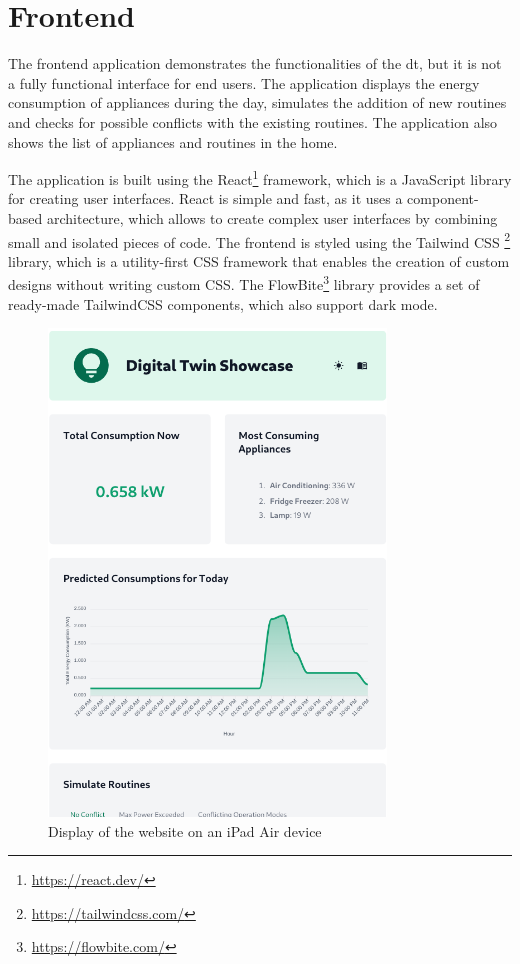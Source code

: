 \section{Frontend}

The frontend application demonstrates the functionalities of the \acrshort{dt}, but it is not a fully functional interface for end users. The application displays the energy consumption of appliances during the day, simulates the addition of new routines and checks for possible conflicts with the existing routines. The application also shows the list of appliances and routines in the home.

The application is built using the React\footnote{\url{https://react.dev/}} framework, which is a JavaScript library for creating user interfaces. React is simple and fast, as it uses a component-based architecture, which allows to create complex user interfaces by combining small and isolated pieces of code. The frontend is styled using the Tailwind CSS \footnote{\url{https://tailwindcss.com/}} library, which is a utility-first CSS framework that enables the creation of custom designs without writing custom CSS. The FlowBite\footnote{\url{https://flowbite.com/}} library provides a set of ready-made TailwindCSS components, which also support dark mode.

\begin{figure}
    \centering
    \includegraphics[width=0.8\textwidth]{images/frontend/responsive.png}
    \caption{Display of the website on an iPad Air device}
    \label{fig:frontend_responsive}
\end{figure}

